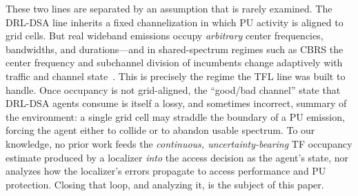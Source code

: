 \documentclass[journal]{IEEEtran}
\begin{document}
These two lines are separated by an assumption that is rarely examined. The
DRL-DSA line inherits a fixed channelization in which PU activity is aligned
to grid cells. But real wideband emissions occupy \emph{arbitrary} center
frequencies, bandwidths, and durations---and in shared-spectrum regimes such
as CBRS the center frequency and subchannel division of incumbents change
adaptively with traffic and channel state~\cite{sohul2015cbrs,zhao2025trtfl_ssl}.
This is precisely the regime the TFL line was built to handle. Once occupancy
is not grid-aligned, the ``good/bad channel'' state that DRL-DSA agents
consume is itself a lossy, and sometimes incorrect, summary of the
environment: a single grid cell may straddle the boundary of a PU emission,
forcing the agent either to collide or to abandon usable spectrum. To our
knowledge, no prior work feeds the \emph{continuous, uncertainty-bearing} TF
occupancy estimate produced by a localizer \emph{into} the access decision as
the agent's state, nor analyzes how the localizer's errors propagate to access
performance and PU protection. Closing that loop, and analyzing it, is the
subject of this paper.
\end{document}

